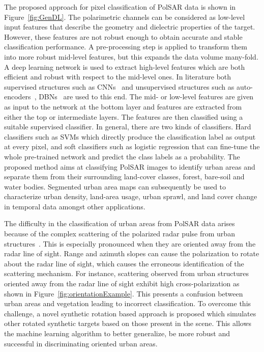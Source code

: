 The proposed approach for pixel classification of PolSAR data is shown in Figure~\ref{fig:GenDL}. The polarimetric channels can be considered as low-level input features that describe the geometry and dielectric properties of the target. However, these features are not robust enough to obtain accurate and stable classification performance. A pre-processing step is  applied to transform them  into more robust mid-level features, but this expands the data volume many-fold. A deep learning network is used to extract high-level features which are both efficient and robust with respect to the mid-level ones. In literature both supervised structures such as CNNs~\cite{hu2015deep} and unsupervised structures such as auto-encoders~\cite{chen2014deep}, DBNs~\cite{chen2015spectral} are used to this end. The mid- or low-level features are given as input to the network at the bottom layer and features are extracted from either the top or intermediate layers.  The  features are then classified using a suitable supervised classifier. In general, there are two kinds of classifiers. Hard classifiers such as SVMs which directly produce the classification label as output at every pixel, and soft classifiers such as logistic regression that can fine-tune the whole pre-trained network and predict the class labels as a probability.
The proposed method aims at classifying PolSAR images to identify urban areas and separate them from their surrounding land-cover classes, forest, bare-soil and water bodies. Segmented urban area maps can subsequently be used to characterize urban density, land-area usage, urban sprawl, and land cover change in temporal data amongst other applications. 

The difficulty in the classification of urban areas from PolSAR data arises because of the complex scattering of the polarized radar pulse from urban structures~\cite{kimura2008radar}. This is especially pronounced when they are oriented away from the radar line of sight. Range and azimuth slopes can cause the polarization to rotate about the radar line of sight, which causes the erroneous identification of the scattering mechanism. %
For instance, scattering observed from urban structures oriented away from the radar line of sight exhibit high cross-polarization as shown in Figure~\ref{fig:orientationExample}. This presents a confusion between urban areas and vegetation leading to incorrect classification. To overcome this challenge, a novel synthetic rotation based approach is proposed which simulates other rotated synthetic targets based on those present in the scene. This allows the machine learning algorithm to better generalize, be more robust and successful in discriminating oriented urban areas. 

